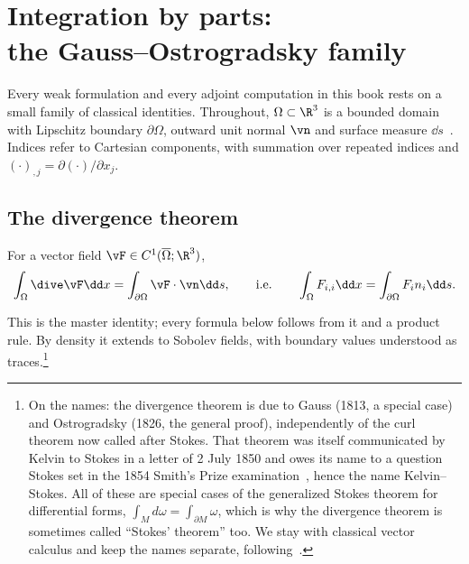 \chapter[Integration by parts: the Gauss--Ostrogradsky family]{Integration by parts:\\ the Gauss--Ostrogradsky family}\label{app:ibp}

Every weak formulation and every adjoint computation in this book rests on a
small family of classical identities. Throughout, $\Omega\subset\R^3$ is a
bounded domain with Lipschitz boundary $\partial\Omega$, outward unit normal
$\vn$ and surface measure $\dd s$~\cite{MarsdenTromba2011,Evans2010B}. Indices
refer to Cartesian components, with summation over repeated indices and
$(\cdot)_{,j}=\partial(\cdot)/\partial x_j$.

\section{The divergence theorem}
\begin{theorem}\label{thm:div}
For a vector field $\vF\in C^1(\overline\Omega;\R^3)$,
\[
  \int_\Omega\dive\vF\dd x=\int_{\partial\Omega}\vF\cdot\vn\dd s,
  \qquad\text{i.e.}\qquad
  \int_\Omega F_{i,i}\dd x=\int_{\partial\Omega}F_in_i\dd s .
\]
\end{theorem}
This is the master identity; every formula below follows from it and a
product rule. By density it extends to Sobolev fields, with boundary values
understood as traces.\footnote{On the names: the divergence theorem is due to
Gauss (1813, a special case) and Ostrogradsky (1826, the general proof),
independently of the curl theorem now called after Stokes. That theorem was
itself communicated by Kelvin to Stokes in a letter of 2 July 1850 and owes
its name to a question Stokes set in the 1854 Smith's Prize
examination~\cite{Katz1979}, hence the name Kelvin--Stokes. All of these are
special cases of the generalized Stokes theorem for differential forms,
$\int_Md\omega=\int_{\partial M}\omega$, which is why the divergence theorem
is sometimes called ``Stokes' theorem'' too. We stay with classical vector
calculus and keep the names separate, following~\cite{MarsdenTromba2011}.}

